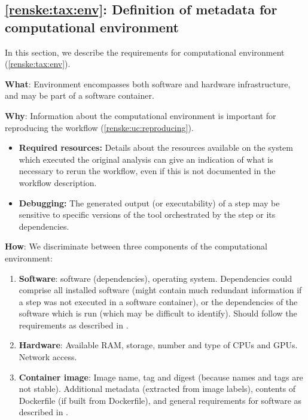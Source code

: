 \subsection{\ref{renske:tax:env}: Definition of metadata for computational environment}
\label{sec:renske:env_reqs}

In this section, we describe the requirements for computational environment (\ref{renske:tax:env}).

\textbf{What}: Environment encompasses both software and hardware infrastructure, and may be part of a software container.

\textbf{Why}: Information about the computational environment is important for reproducing the workflow (\ref{renske:uc:reproducing}). 

\begin{itemize}
    \item \textbf{Required resources:} Details about the resources available on the system which executed the original analysis can give an indication of what is necessary to rerun the workflow, even if this is not documented in the workflow description.
    \item \textbf{Debugging:} The generated output (or executability) of a step may be sensitive to specific versions of the tool orchestrated by the step or its dependencies.
\end{itemize}

\textbf{How}: We discriminate between three components of the computational environment:
\begin{enumerate}[label=\textbf{ENV\arabic*}]
    \item \textbf{Software}: software (dependencies), operating system. Dependencies could comprise all installed software (might contain much redundant information if a step was not executed in a software container), or the dependencies of the software which is run (which may be difficult to identify). Should follow the requirements as described in . \label{renske:req:env_software}
    \item \textbf{Hardware}: Available RAM, storage, number and type of CPUs and GPUs. Network access. \label{renske:req:env_hardware}
    \item \textbf{Container image}: Image name, tag and digest (because names and tags are not stable). Additional metadata (extracted from image labels), contents of Dockerfile (if built from Dockerfile), and general requirements for software as described in . \label{renske:req:env_image}
\end{enumerate}
